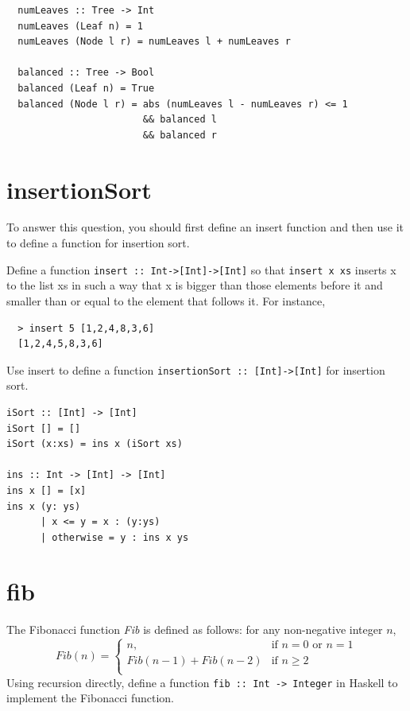 \documentclass[tikz,border=10pt]{project_plan}
\begin{document}
\begin{lstlisting}
  numLeaves :: Tree -> Int
  numLeaves (Leaf n) = 1
  numLeaves (Node l r) = numLeaves l + numLeaves r

  balanced :: Tree -> Bool
  balanced (Leaf n) = True
  balanced (Node l r) = abs (numLeaves l - numLeaves r) <= 1
                        && balanced l
                        && balanced r
 \end{lstlisting}

\section{insertionSort}

To answer this question, you should first define an insert function
and then use it to define a function for insertion sort.

Define a function \lstinline?insert :: Int->[Int]->[Int]? so that \lstinline?insert x xs?
inserts x to the list xs in such a way that x is bigger than those
elements before it and smaller than or equal to the element that
follows it. For instance,\\
\begin{lstlisting}
  > insert 5 [1,2,4,8,3,6]
  [1,2,4,5,8,3,6]
\end{lstlisting}

Use insert to define a function \lstinline?insertionSort :: [Int]->[Int]?
for insertion sort.

\begin{lstlisting}
iSort :: [Int] -> [Int]
iSort [] = []
iSort (x:xs) = ins x (iSort xs)

ins :: Int -> [Int] -> [Int]
ins x [] = [x]
ins x (y: ys)
      | x <= y = x : (y:ys)
      | otherwise = y : ins x ys
\end{lstlisting}

\section{fib}

The Fibonacci function \textit{Fib} is defined as follows: for any non-negative
integer $n$,
\begin{equation*}
  Fib(n) =
  \begin{cases}
    n,                      & \text{if $n = 0$ or $n = 1$} \\
    Fib(n - 1) + Fib(n - 2) & \text{if $n \geq 2$}         \\
  \end{cases}
\end{equation*}
Using recursion directly, define a function \lstinline?fib :: Int -> Integer?
in Haskell to implement the Fibonacci function.
\end{document}

